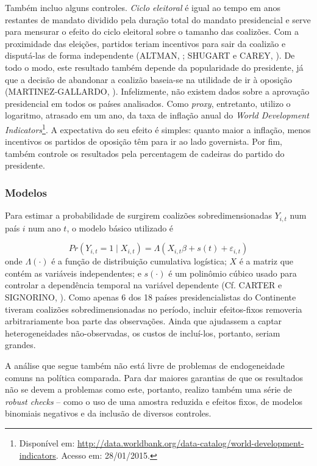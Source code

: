 Também incluo alguns controles. \textit{Ciclo eleitoral} é igual ao tempo em anos restantes de mandato dividido pela duração total do mandato presidencial e serve para mensurar o efeito do ciclo eleitoral sobre o tamanho das coalizões. Com a proximidade das eleições, partidos teriam incentivos para sair da coalizão e disputá-las de forma independente (ALTMAN, \citeyear{altman2000}; SHUGART e CAREY, \citeyear{shugart1992}). De todo o modo, este resultado também depende da popularidade do presidente, já que a decisão de abandonar a coalizão baseia-se na utilidade de ir à oposição (MARTINEZ-GALLARDO, \citeyear{martinez2012}). Infelizmente, não existem dados sobre a aprovação presidencial em todos os países analisados. Como \textit{proxy}, entretanto, utilizo o logaritmo, atrasado em um ano, da taxa de inflação anual do \textit{World Development Indicators}\footnote{Disponível em: \url{http://data.worldbank.org/data-catalog/world-development-indicators}. Acesso em: 28/01/2015.}. A expectativa do seu efeito é simples: quanto maior a inflação, menos incentivos os partidos de oposição têm para ir ao lado governista. Por fim, também controle os resultados pela percentagem de cadeiras do partido do presidente.

\subsubsection{Modelos}

Para estimar a probabilidade de surgirem coalizões sobredimensionadas $Y_{i, t}$ num país $i$ num ano $t$, o modelo básico utilizado é

\begin{equation}
Pr(Y_{i, t} = 1 \mid X_{i, t}) = \Lambda(X_{i, t}\beta + s(t) + \varepsilon_{i, t})
\end{equation}
\noindent
onde $\Lambda(\cdot)$ é a função de distribuição cumulativa logística; $X$ é a matriz que contém as variáveis independentes; e $s(\cdot)$ é um polinômio cúbico usado para controlar a dependência temporal na variável dependente (Cf. CARTER e SIGNORINO, \citeyear{carter2010}). Como apenas 6 dos 18 países presidencialistas do Continente tiveram coalizões sobredimensionadas no período, incluir efeitos-fixos removeria arbitrariamente boa parte das observações. Ainda que ajudassem a captar heterogeneidades não-observadas, os custos de incluí-los, portanto, seriam grandes. 
 
A análise que segue também não está livre de problemas de endogeneidade comuns na política comparada. Para dar maiores garantias de que os resultados não se devem a problemas como este, portanto, realizo também uma série de \textit{robust checks} -- como o uso de uma amostra reduzida e efeitos fixos, de modelos binomiais negativos e da inclusão de diversos controles.